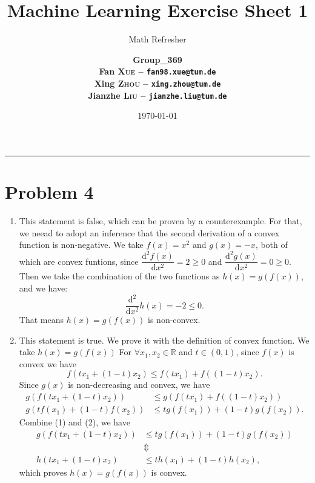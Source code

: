 \documentclass[12pt]{scrartcl}
\title{\large Machine Learning Exercise Sheet 1}
\subtitle{\Large Math Refresher}
\author{\large\bfseries Group\_369 \\
        \large Fan \textsc{Xue} -- \texttt{fan98.xue@tum.de} \\
        \large Xing \textsc{Zhou} -- \texttt{xing.zhou@tum.de} \\
        \large Jianzhe \textsc{Liu} -- \texttt{jianzhe.liu@tum.de}}
\date{\large \today}
\newcommand{\R}{\mathbb{R}}
\begin{document}
  
  \maketitle
  \vspace{-1cm}
  \noindent\rule{\textwidth}{0.4pt}
  
  \section*{Problem 4}

  \begin{enumerate}[label=\alph*)]
    \item This statement is false, which can be proven by a counterexample. For that, we neead to adopt an inference that the second derivation of a convex function is non-negative.
    We take $f(x)=x^2$ and $g(x)=-x$, both of which are convex funtions, since $\dfrac{\mathrm{d}^{2}f(x)}{\mathrm{d}x^{2}}=2 \ge 0$ and $\dfrac{\mathrm{d^{2}}g(x)}{\mathrm{d}x^{2}}=0 \ge 0$.
    Then we take the combination of the two functions as $h(x)=g(f(x))$, and we have:
    \begin{equation*}
      \frac{\mathrm{d^{2}}}{\mathrm{d}x^{2}}h(x)=-2 \le 0.
    \end{equation*}
    That means $h(x)=g(f(x))$ is non-convex.

    \item This statement is true. We prove it with the definition of convex function. We take $h(x)=g(f(x))$
    For $\forall x_{1},x_{2}\in \R$ and $t \in (0,1)$, since $f(x)$ is convex we have
    \begin{equation*}
      f\left( tx_{1}+(1-t)x_{2} \right) \le f\left( tx_{1} \right) + f\left( (1-t)x_{2} \right).
    \end{equation*}
    Since $g(x)$ is non-decreasing and convex, we have
    \begin{align}
      g\left(f\left( tx_{1}+(1-t)x_{2} \right)\right) &\le g\left( f\left( tx_{1} \right) + f\left( (1-t)x_{2} \right) \right) \\
      g\left( tf(x_1) + (1-t)f(x_2) \right) &\le tg\left( f(x_1) \right) + (1-t)g\left( f(x_2) \right).
    \end{align}
    Combine (1) and (2), we have
    \begin{align*}
      g\left(f\left( tx_{1}+(1-t)x_{2} \right)\right) &\le tg\left( f(x_1) \right) + (1-t)g\left( f(x_2) \right) \\
      &\Updownarrow \\
      h\left( tx_{1}+(1-t)x_{2} \right) &\le th(x_1) + (1-t)h(x_2),
    \end{align*}
    which proves $h(x)=g(f(x))$ is convex.
  \end{enumerate}
  
\end{document}
